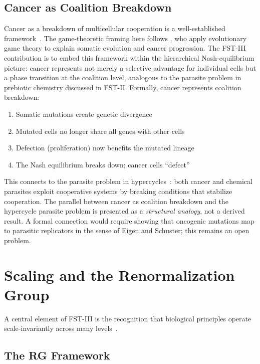 \documentclass[12pt,a4paper]{article}
\theoremstyle{remark}
\begin{document}
\subsection{Cancer as Coalition Breakdown}

Cancer as a breakdown of multicellular cooperation is a well-established framework~\citep{AktipisCancer}. The game-theoretic framing here follows \citet{AktipisCancer}, who apply evolutionary game theory to explain somatic evolution and cancer progression. The FST-III contribution is to embed this framework within the hierarchical Nash-equilibrium picture: cancer represents not merely a selective advantage for individual cells but a phase transition at the coalition level, analogous to the parasite problem in prebiotic chemistry discussed in FST-II. Formally, cancer represents coalition breakdown:
\begin{enumerate}
    \item Somatic mutations create genetic divergence
    \item Mutated cells no longer share all genes with other cells
    \item Defection (proliferation) now benefits the mutated lineage
    \item The Nash equilibrium breaks down; cancer cells ``defect''
\end{enumerate}

This connects to the parasite problem in hypercycles~\citep{FSTII}: both cancer and chemical parasites exploit cooperative systems by breaking conditions that stabilize cooperation. The parallel between cancer as coalition breakdown and the hypercycle parasite problem is presented as a \emph{structural analogy}, not a derived result. A formal connection would require showing that oncogenic mutations map to parasitic replicators in the sense of Eigen and Schuster; this remains an open problem.

\section{Scaling and the Renormalization Group}
\label{sec:renormalization}

A central element of FST-III is the recognition that biological principles operate scale-invariantly across many levels~\citep{ScaleRGFrontiers,ScaleRGResearch}.

\subsection{The RG Framework}
\end{document}
